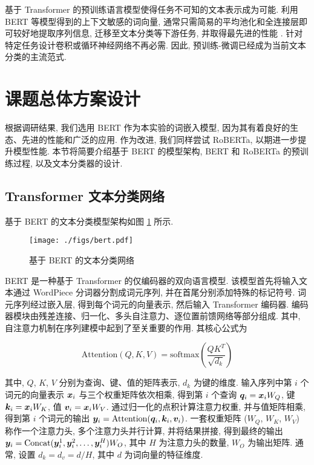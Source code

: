 \documentclass[12pt,a4paper]{article}
\begin{document}
基于 Transformer 的预训练语言模型使得任务不可知的文本表示成为可能. 利用 BERT 等模型得到的上下文敏感的词向量, 通常只需简易的平均池化和全连接层即可较好地提取序列信息, 迁移至文本分类等下游任务, 并取得最先进的性能 \cite{devlin_bert_2019}. 针对特定任务设计卷积或循环神经网络不再必需. 因此, 预训练-微调已经成为当前文本分类的主流范式.


\section{课题总体方案设计}

根据调研结果, 我们选用 BERT 作为本实验的词嵌入模型, 因为其有着良好的生态、先进的性能和广泛的应用. 作为改进, 我们同样尝试 RoBERTa, 以期进一步提升模型性能. 本节将简要介绍基于 BERT 的模型架构, BERT 和 RoBERTa 的预训练过程, 以及文本分类器的设计.

\subsection{Transformer 文本分类网络}

基于 BERT 的文本分类模型架构如图 \ref{fig:bert-architecture} 所示.

\begin{figure}[htbp]
    \centering
    \texttt{[image: ./figs/bert.pdf]}
    \caption{基于 BERT 的文本分类网络}\label{fig:bert-architecture}
\end{figure}

BERT 是一种基于 Transformer 的仅编码器的双向语言模型. 该模型首先将输入文本通过 WordPiece 分词器分割成词元序列, 并在首尾分别添加特殊的标记符号. 词元序列经过嵌入层, 得到每个词元的向量表示, 然后输入 Transformer 编码器. 编码器模块由残差连接、归一化、多头自注意力、逐位置前馈网络等部分组成. 其中, 自注意力机制在序列建模中起到了至关重要的作用. 其核心公式为

\begin{equation}
    \mathrm{Attention}(Q, K, V) = \mathrm{softmax}\left(\frac{QK^T}{\sqrt{d_k}}\right)
\end{equation}

其中, $Q$, $K$, $V$ 分别为查询、键、值的矩阵表示, $d_k$ 为键的维度. 输入序列中第 $i$ 个词元的向量表示 ${\bm{x}}_i$ 与三个权重矩阵依次相乘, 得到第 $i$ 个查询 ${\bm{q}}_i = {\bm{x}}_i W_Q$, 键 ${\bm{k}}_i = {\bm{x}}_i W_K$, 值 ${\bm{v}}_i = {\bm{x}}_i W_V$. 通过归一化的点积计算注意力权重, 并与值矩阵相乘, 得到第 $i$ 个词元的输出 ${\bm{y}}_i = \mathrm{Attention}({\bm{q}}_i, {\bm{k}}_i, {\bm{v}}_i)$. 一套权重矩阵 ($W_Q$, $W_K$, $W_V$) 称作一个注意力头, 多个注意力头并行计算, 并将结果拼接, 得到最终的输出 ${\bm{y}}_i = \mathrm{Concat}({\bm{y}}_i^1, {\bm{y}}_i^2, \dots, {\bm{y}}_i^H) W_O$, 其中 $H$ 为注意力头的数量, $W_O$ 为输出矩阵. 通常, 设置 $d_k = d_v = d / H$, 其中 $d$ 为词向量的特征维度.
\end{document}
